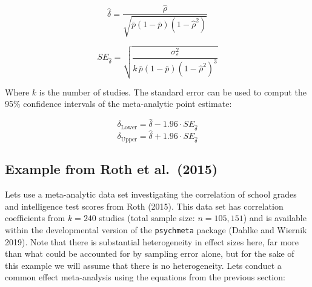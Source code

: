 \documentclass[
  letterpaper,
  DIV=11,
  numbers=noendperiod]{scrreprt}
\begin{document}
\[
\hat{\delta} = \frac{\hat{\rho}}{\sqrt{\bar{p}(1-\bar{p})(1-\hat{\rho}^2)}}
\]

\[
SE_{\hat{\delta}} = \sqrt{\frac{\sigma_\varepsilon^2}{k\,\bar{p}(1-\bar{p})(1-\hat{\rho}^2)^3}}
\]

Where \(k\) is the number of studies. The standard error can be used to
comput the 95\% confidence intervals of the meta-analytic point
estimate:

\[
\delta_{\text{Lower}} = \hat{\delta}- 1.96 \cdot SE_\hat{\delta}
\] \[
\delta_{\text{Upper}} = \hat{\delta}+ 1.96\cdot SE_\hat{\delta}
\]

\hypertarget{example-from-roth-et-al.-2015}{%
\subsection{Example from Roth et
al.~(2015)}\label{example-from-roth-et-al.-2015}}

Lets use a meta-analytic data set investigating the correlation of
school grades and intelligence test scores from Roth (2015). This data
set has correlation coefficients from \(k=240\) studies (total sample
size: \(n=105,151\)) and is available within the developmental version
of the \texttt{psychmeta} package (Dahlke and Wiernik 2019). Note that
there is substantial heterogeneity in effect sizes here, far more than
what could be accounted for by sampling error alone, but for the sake of
this example we will assume that there is no heterogeneity. Lets conduct
a common effect meta-analysis using the equations from the previous
section:
\end{document}
